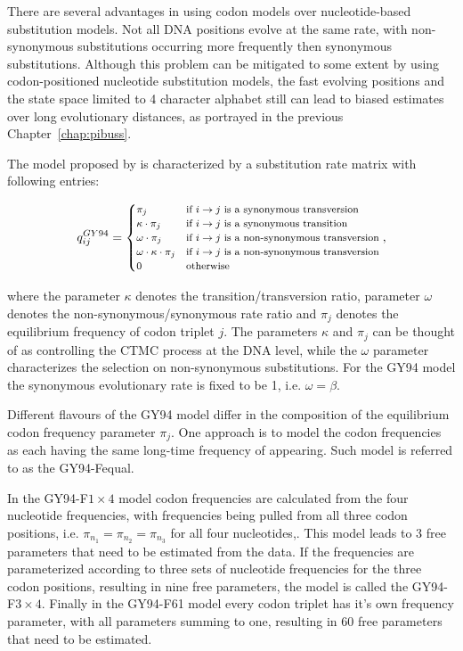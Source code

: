 There are several advantages in using codon models over nucleotide-based substitution models.
Not all DNA positions evolve at the same rate, with non-synonymous substitutions occurring more frequently then synonymous substitutions.
Although this problem can be mitigated to some extent by using codon-positioned nucleotide substitution models, the fast evolving positions and the state space limited to 4 character alphabet still can lead to biased estimates over long evolutionary distances, as portrayed in the previous Chapter~\ref{chap:pibuss}.

The model proposed by \cite{Goldman1994} is characterized by a substitution rate matrix with following entries:

\begin{equation}
\footnotesize{
q_{ij}^{GY94}=\begin{cases}
\pi_{j} & \text{if \ensuremath{i\rightarrow j} is a synonymous transversion}\\
\kappa\cdot\pi_{j} & \text{if \ensuremath{i\rightarrow j} is a synonymous transition}\\
\omega\cdot\pi_{j} & \text{if \ensuremath{i\rightarrow j} is a non-synonymous transversion}\\
\omega\cdot\kappa\cdot\pi_{j} & \text{if \ensuremath{i\rightarrow j} is a non-synonymous transversion}\\
0 & \text{otherwise}
\end{cases},
} %
\label{eq:gy94}
\end{equation}

\noindent
where the parameter $\kappa$ denotes the transition/transversion ratio, parameter $\omega$ denotes the non-synonymous/synonymous
rate ratio and $\pi_j$ denotes the equilibrium frequency of codon triplet $j$.
The parameters $\kappa$ and $\pi_j$ can be thought of as controlling the CTMC process at the DNA level, while the $\omega$ parameter characterizes the selection on non-synonymous substitutions.
For the GY94 model the synonymous evolutionary rate is fixed to be 1, i.e. $\omega=\beta$.

Different flavours of the GY94 model differ in the composition of the equilibrium codon frequency parameter $\pi_{j}$.
One approach is to model the codon frequencies as each having the same long-time frequency of appearing. 
Such model is referred to as the GY94-Fequal.

In the GY94-F$1\times4$ model codon frequencies are calculated from the four nucleotide frequencies, with frequencies being pulled from all three codon positions, i.e. $\pi_{n_{1}}=\pi_{n_{2}}=\pi_{n_{3}}$ for all four nucleotides,.
This model leads to 3 free parameters that need to be estimated from the data. 
If the frequencies are parameterized according to three sets of nucleotide frequencies for the three codon positions, resulting in nine free parameters, the model is called the GY94-F$3\times4$.
Finally in the GY94-F61 model every codon triplet has it's own frequency parameter, with all parameters summing to one, resulting in 60 free parameters that need to be estimated.

